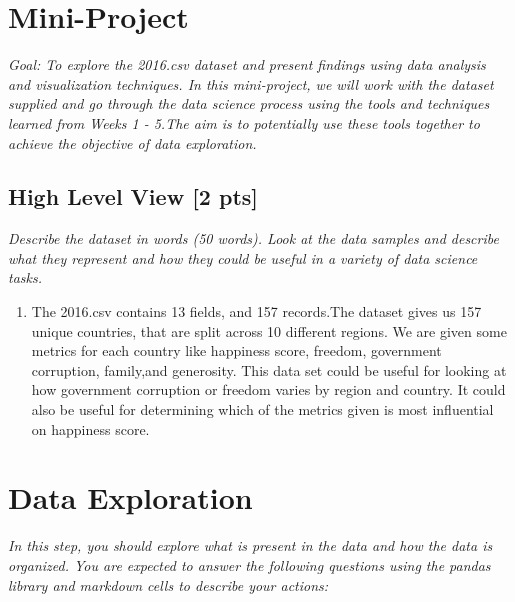 \documentclass{article}%
\begin{document}
%
\normalsize%
\pagestyle{header}%
\section{Mini{-}Project}%
\label{sec:Mini{-}Project}%
\textit{Goal: To explore the 2016.csv dataset and present findings using data analysis and visualization techniques.    In this mini{-}project, we will work with the dataset supplied and go through the data science process using the tools     and techniques learned from Weeks 1 {-} 5.The aim is to potentially use these tools together to achieve the objective of data exploration.}%
\subsection{High Level View {[}2 pts{]}}%
\label{subsec:HighLevelView2pts}%
\textit{Describe the dataset in words (50 words). Look at the data samples and describe what they represent and how they could be useful in a variety of data science tasks.}%
\begin{enumerate}%
\item%
The 2016.csv contains 13 fields, and 157 records.The dataset gives us 157 unique countries, that are split across 10 different regions. We are given some metrics for each country like  happiness score, freedom, government corruption, family,and generosity. This data set could be useful for looking at how government corruption or freedom varies by region and country. It could also be useful for determining which of the metrics given is most influential on happiness score.%
\end{enumerate}

%
\section{Data Exploration}%
\label{sec:DataExploration}%
\textit{In this step, you should explore what is present in the data and how the data is organized.    You are expected to answer the following questions using the pandas library and markdown cells to describe your actions:}%
\end{document}
